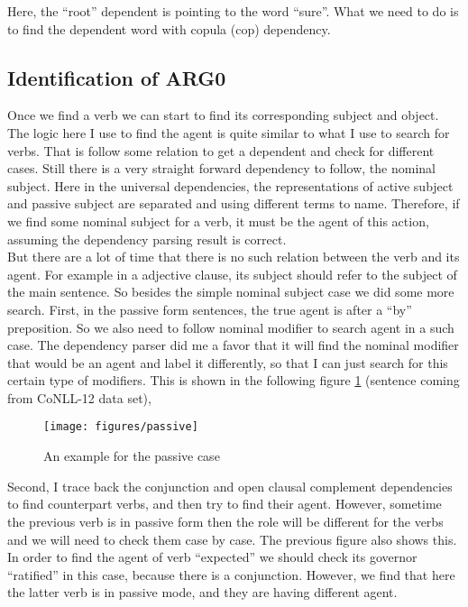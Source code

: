 \documentclass[letterpaper]{article}
\begin{document}
Here, the ``root'' dependent is pointing to the word ``sure''. What we need to do is to find the dependent word with copula (cop) dependency.

\subsection{Identification of ARG0}

Once we find a verb we can start to find its corresponding subject and object. The logic here I use to find the agent is quite similar to what I use to search for verbs. That is follow some relation to get a dependent and check for different cases. Still there is a very straight forward dependency to follow, the nominal subject. Here in the universal dependencies, the representations of active subject and passive subject are separated and using different terms to name. Therefore, if we find some nominal subject for a verb, it must be the agent of this action, assuming the dependency parsing result is correct.\\

But there are a lot of time that there is no such relation between the verb and its agent. For example in a adjective clause, its subject should refer to the subject of the main sentence. So besides the simple nominal subject case we did some more search. First, in the passive form sentences, the true agent is after a ``by'' preposition. So we also need to follow nominal modifier to search agent in a such case. The dependency parser did me a favor that it will find the nominal modifier that would be an agent and label it differently, so that I can just search for this certain type of modifiers. This is shown in the following figure \ref{fig:passive} (sentence coming from CoNLL-12 data set),

\begin{figure}[H]
\centering
\texttt{[image: figures/passive]}
\caption[]{An example for the passive case}
\label{fig:passive}
\end{figure}

Second, I trace back the conjunction and open clausal complement dependencies to find counterpart verbs, and then try to find their agent. However, sometime the previous verb is in passive form then the role will be different for the verbs and we will need to check them case by case. The previous figure also shows this. In order to find the agent of verb ``expected'' we should check its governor ``ratified'' in this case, because there is a conjunction. However, we find that here the latter verb is in passive mode, and they are having different agent.\\
\end{document}

